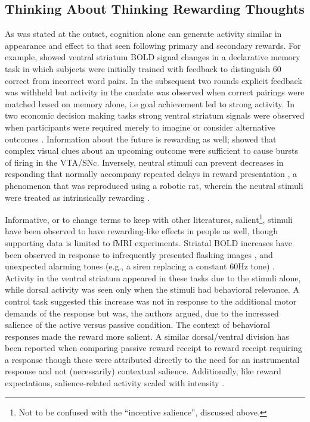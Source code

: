 \subsection{Thinking About Thinking Rewarding Thoughts}
\label{sub:cogrew}
As was stated at the outset, cognition alone can generate activity similar in appearance and effect to that seen following primary and secondary rewards.  For example, \citet{Tricomi:2008p6663} showed ventral striatum BOLD signal changes in a declarative memory task in which subjects were initially trained with feedback to distinguish 60 correct from incorrect word pairs.  In the subsequent two rounds explicit feedback was withheld but activity in the caudate was observed when correct pairings were matched based on memory alone, i.e goal achievement led to strong activity.  In two economic decision making tasks strong ventral striatum signals were observed when participants were required merely to imagine or consider alternative outcomes  \citep{Hayden:2009p6545, Lohrenz:2007p7240}.  Information about the future is rewarding as well; \citet{BrombergMartin:2009p7220} showed that complex visual clues about an upcoming outcome were sufficient to cause bursts of firing in the VTA/SNc.  Inversely, neutral stimuli can prevent decreases in responding that normally accompany repeated delays in reward presentation \citep{Reed:1992p9094}, a phenomenon that was reproduced using a robotic rat, wherein the neutral stimuli were treated as intrinsically rewarding \citep{Fiore:2008p7249}.

Informative, or to change terms to keep with other literatures, salient\footnote{
    Not to be confused with the ``incentive salience'', discussed above.
}, stimuli have been observed to have rewarding-like effects in people as well, though supporting data is limited to fMRI experiments.  Striatal BOLD increases have been observed in response to infrequently presented flashing images \citep{Zink:2003p5107}, and unexpected alarming tones (e.g., a siren replacing a constant 60Hz tone) \citep{Zink:2006p7210}.  Activity in the ventral striatum appeared in these tasks due to the stimuli alone, while dorsal activity was seen only when the stimuli had behavioral relevance.  A control task suggested this increase was not in response to the additional motor demands of the response but was, the authors argued, due to the increased salience of the active versus passive condition.  The context of behavioral responses made the reward more salient.  A similar dorsal/ventral division has been reported when comparing passive reward receipt to reward receipt requiring a response \citep{ODoherty:2006p2875} though these were attributed directly to the need for an instrumental response and not (necessarily) contextual salience.  Additionally, like reward expectations, salience-related activity scaled with intensity \citep{Zink:2006p7210}.

